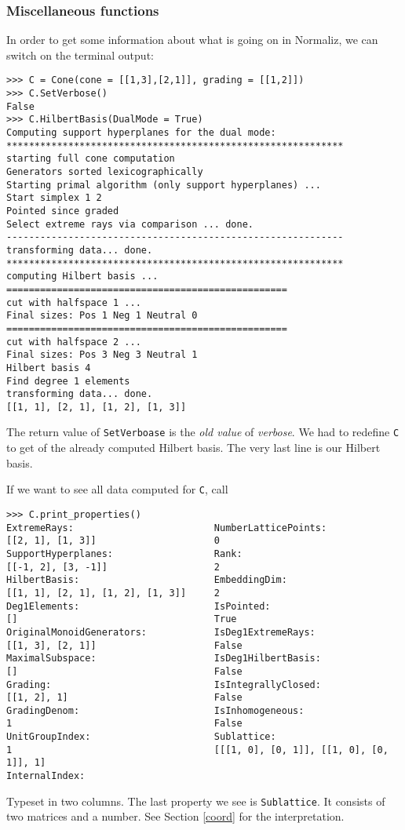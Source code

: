\documentclass[12pt,a4paper]{scrartcl}
\theoremstyle{definition}
\begin{document}
\begin{small}
\subsubsection{Miscellaneous functions}
In order to get some information about what is going on in Normaliz, we can switch on the terminal output:
\begin{Verbatim}
>>> C = Cone(cone = [[1,3],[2,1]], grading = [[1,2]])
>>> C.SetVerbose()
False
>>> C.HilbertBasis(DualMode = True)
Computing support hyperplanes for the dual mode:
************************************************************
starting full cone computation
Generators sorted lexicographically
Starting primal algorithm (only support hyperplanes) ...
Start simplex 1 2 
Pointed since graded
Select extreme rays via comparison ... done.
------------------------------------------------------------
transforming data... done.
************************************************************
computing Hilbert basis ...
==================================================
cut with halfspace 1 ...
Final sizes: Pos 1 Neg 1 Neutral 0
==================================================
cut with halfspace 2 ...
Final sizes: Pos 3 Neg 3 Neutral 1
Hilbert basis 4
Find degree 1 elements
transforming data... done.
[[1, 1], [2, 1], [1, 2], [1, 3]]
\end{Verbatim}
The return value of \verb|SetVerboase| is the \emph{old value} of  \emph{verbose}. We had to redefine \verb|C| to get of the already computed Hilbert basis. The very last line is our Hilbert basis.

If we want to see all data computed for \verb|C|, call
\begin{Verbatim}
>>> C.print_properties()
ExtremeRays:                         NumberLatticePoints:
[[2, 1], [1, 3]]                     0
SupportHyperplanes:                  Rank:
[[-1, 2], [3, -1]]                   2
HilbertBasis:                        EmbeddingDim:
[[1, 1], [2, 1], [1, 2], [1, 3]]     2
Deg1Elements:                        IsPointed:
[]                                   True
OriginalMonoidGenerators:            IsDeg1ExtremeRays:
[[1, 3], [2, 1]]                     False
MaximalSubspace:                     IsDeg1HilbertBasis:
[]                                   False
Grading:                             IsIntegrallyClosed:
[[1, 2], 1]                          False
GradingDenom:                        IsInhomogeneous:
1                                    False
UnitGroupIndex:                      Sublattice:
1                                    [[[1, 0], [0, 1]], [[1, 0], [0, 1]], 1]
InternalIndex:
\end{Verbatim}
Typeset in two columns. The last property we see is \verb|Sublattice|. It consists of two matrices and a number. See Section \ref{coord} for the interpretation.


\end{small}
\end{document}
